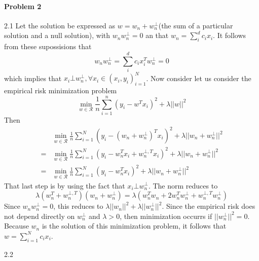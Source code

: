 \documentclass[12pt]{report}
\begin{document}
\paragraph{Problem 2}
2.1
Let the solution be expressed as $w = w_{n} + w_{n}^{\bot}$(the sum of a particular solution and a null solution), with $w_{n}w_{n}^{\bot} = 0$ an that $w_{n} = \sum^{d}_{i}c_{i}x_{i}$.  It follows from these supossisions that
$$ w_{n}w_{n}^{\bot} = \sum^{d}_{i}c_{i}x_{i}^{T}w_{n}^{\bot}= 0$$ which implies that $x_{i} \bot w_{n}^{\bot}, \forall x_{i} \in (x_{i}, y_{i})^{N}_{i=1}$. Now consider let us consider the empirical risk minimization problem
$$\min_{w \in \mathcal{R}} \frac{1}{n} \sum^{n}_{i=1}(y_{i} - w^{T}x_{i})^{2} + \lambda \lvert \lvert w \rvert \rvert^{2}$$ Then
\begin{equation}
  \begin{aligned}
    & \min_{w \in \mathcal{R}} \frac{1}{n} \sum^{N}_{i=1} (y_{i} - (w_{n}+w^{\bot}_{n})^{T}x_{i})^{2} + \lambda \lvert \lvert w_{n}+w^{\bot}_{n} \rvert \rvert^{2} \\
    = & \min_{w \in \mathcal{R}} \frac{1}{n} \sum^{N}_{i=1} (y_{i} - w_{n}^{T}x_{i} +w^{\bot, T}_{n}x_{i})^{2} + \lambda \lvert \lvert w_{n}+w^{\bot}_{n} \rvert \rvert^{2} \\
    = & \min_{w \in \mathcal{R}} \frac{1}{n} \sum^{N}_{i=1} (y_{i} - w_{n}^{T}x_{i})^{2} + \lambda \lvert \lvert w_{n}+w^{\bot}_{n} \rvert \rvert^{2} 
  \end{aligned}
\end{equation}
That last step is by using the fact that $x_{i} \bot w_{n}^{\bot}$. The norm reduces to
$$ \lambda (w_{n}^{T} + w_{n}^{\bot, T})(w_{n} + w_{n}^{\bot}) = \lambda(w_{n}^{T}w_{n} + 2w_{n}^{T}w_{n}^{\bot}+w_{n}^{\bot, T}w_{n}^{\bot})$$
Since $w_{n}w_{n}^{\bot} = 0$, this reduces to $ \lambda \lvert \lvert w_{n} \rvert \rvert^{2} + \lambda \lvert \lvert w_{n}^{\bot} \rvert \rvert^{2} $. Since the empirical risk does not depend directly on $w_{n}^{\bot}$ and $\lambda > 0$, then minimization occurrs if $\lvert \lvert w_{n}^{\bot} \rvert \rvert^{2} = 0$. Because $w_{n}$ is the solution of this minimization problem, it follows that $w = \sum^{N}_{i=1} c_{i} x_{i}$.

2.2
\end{document}
